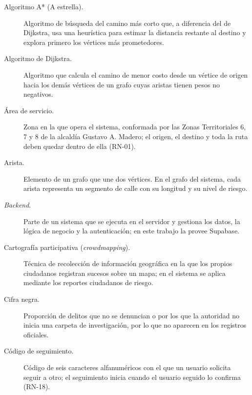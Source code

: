 
\begin{description}
    \item[Algoritmo A* (A estrella).] Algoritmo de búsqueda del camino más corto que, a diferencia del de Dijkstra, usa una heurística para estimar la distancia restante al destino y explora primero los vértices más prometedores.

    \item[Algoritmo de Dijkstra.] Algoritmo que calcula el camino de menor costo desde un vértice de origen hacia los demás vértices de un grafo cuyas aristas tienen pesos no negativos.

    \item[Área de servicio.] Zona en la que opera el sistema, conformada por las Zonas Territoriales 6, 7 y 8 de la alcaldía Gustavo A. Madero; el origen, el destino y toda la ruta deben quedar dentro de ella (RN-01).

    \item[Arista.] Elemento de un grafo que une dos vértices. En el grafo del sistema, cada arista representa un segmento de calle con su longitud y su nivel de riesgo.

    \item[\textit{Backend}.] Parte de un sistema que se ejecuta en el servidor y gestiona los datos, la lógica de negocio y la autenticación; en este trabajo la provee Supabase.

    \item[Cartografía participativa (\textit{crowdmapping}).] Técnica de recolección de información geográfica en la que los propios ciudadanos registran sucesos sobre un mapa; en el sistema se aplica mediante los reportes ciudadanos de riesgo.

    \item[Cifra negra.] Proporción de delitos que no se denuncian o por los que la autoridad no inicia una carpeta de investigación, por lo que no aparecen en los registros oficiales.

    \item[Código de seguimiento.] Código de seis caracteres alfanuméricos con el que un usuario solicita seguir a otro; el seguimiento inicia cuando el usuario seguido lo confirma (RN-18).


\end{description}
